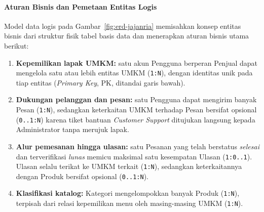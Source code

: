\paragraph*{Aturan Bisnis dan Pemetaan Entitas Logis}
Model data logis pada Gambar~\ref{fig:erd-jajanria} memisahkan konsep entitas bisnis dari struktur fisik tabel basis data dan menerapkan aturan bisnis utama berikut:
\begin{enumerate}[leftmargin=1.5em, itemsep=2pt, topsep=2pt]
  \item \textbf{Kepemilikan lapak UMKM:} satu akun Pengguna berperan Penjual dapat mengelola satu atau lebih entitas UMKM (\texttt{1:N}), dengan identitas unik pada tiap entitas (\textit{Primary Key}, PK, ditandai garis bawah).
  \item \textbf{Dukungan pelanggan dan pesan:} satu Pengguna dapat mengirim banyak Pesan (\texttt{1:N}), sedangkan keterkaitan UMKM terhadap Pesan bersifat opsional (\texttt{0..1:N}) karena tiket bantuan \textit{Customer Support} ditujukan langsung kepada Administrator tanpa merujuk lapak.
  \item \textbf{Alur pemesanan hingga ulasan:} satu Pesanan yang telah berstatus \textit{selesai} dan terverifikasi \textit{lunas} memicu maksimal satu kesempatan Ulasan (\texttt{1:0..1}). Ulasan selalu terikat ke UMKM terkait (\texttt{1:N}), sedangkan keterkaitannya dengan Produk bersifat opsional (\texttt{0..1:N}).
  \item \textbf{Klasifikasi katalog:} Kategori mengelompokkan banyak Produk (\texttt{1:N}), terpisah dari relasi kepemilikan menu oleh masing-masing UMKM (\texttt{1:N}).
\end{enumerate}

